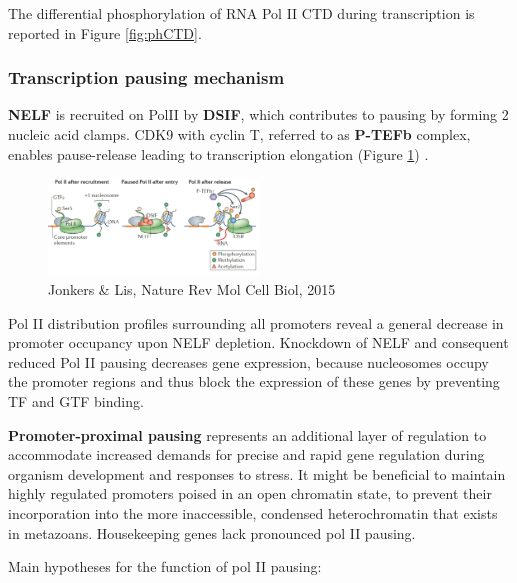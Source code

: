 The differential phosphorylation of RNA Pol II CTD during transcription is reported in Figure \ref{fig:phCTD}.

\hypertarget{transcription-pausing-mechanism}{%
\subsubsection{Transcription pausing mechanism}\label{transcription-pausing-mechanism}}

\textbf{NELF} is recruited on PolII by \textbf{DSIF}, which contributes to pausing by forming 2 nucleic acid clamps. CDK9 with cyclin T, referred to as \textbf{P-TEFb} complex, enables pause-release leading to transcription elongation (Figure \ref{fig:dsif}) .

\begin{figure}
\centering
\includegraphics[width=0.5\textwidth]{../_resources/Screenshot_2022-09-22_at_22-14-15.png}
\caption{Jonkers \& Lis, Nature Rev Mol Cell Biol, 2015}
\label{fig:dsif}
\end{figure}

Pol II distribution profiles surrounding all promoters reveal a general decrease in promoter occupancy upon NELF depletion. Knockdown of NELF and consequent reduced Pol II pausing decreases gene expression, because nucleosomes occupy the promoter regions and thus block the expression of these genes by preventing TF and GTF binding.

\textbf{Promoter-proximal pausing} represents an additional layer of regulation to accommodate increased demands for precise and rapid gene regulation during organism development and responses to stress. It might be beneficial to maintain highly regulated promoters poised in an open chromatin state, to prevent their incorporation into the more inaccessible, condensed heterochromatin that exists in metazoans. Housekeeping genes lack pronounced pol II pausing.

Main hypotheses for the function of pol II pausing:

